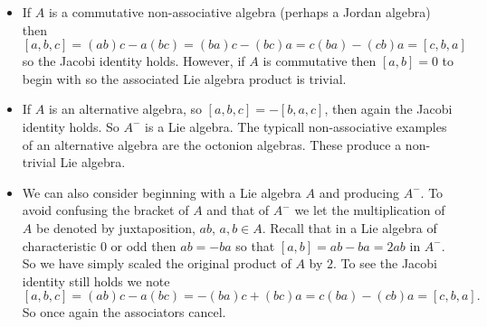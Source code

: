 \documentclass[12pt]{article}
\begin{document}
\begin{itemize}
\item If $A$ is a commutative non-associative algebra (perhaps a Jordan algebra) then 
   \[[a,b,c]=(ab)c-a(bc)=(ba)c-(bc)a=c(ba)-(cb)a=[c,b,a]\]
so the Jacobi identity holds.  However, if $A$ is commutative
then $[a,b]=0$ to begin with so the associated Lie algebra product is
trivial.

\item If $A$ is an alternative algebra, so $[a,b,c]=-[b,a,c]$, then again
the Jacobi identity holds.  So $A^-$ is a Lie algebra.  The typicall non-associative examples of an alternative algebra are the octonion algebras.
These produce a non-trivial Lie algebra.

\item We can also consider beginning with a Lie algebra $A$ and producing
$A^-$.  To avoid confusing the bracket of $A$ and that of $A^-$ we let the
multiplication of $A$ be denoted by juxtaposition, $ab$, $a,b\in A$.  Recall
that in a Lie algebra of characteristic 0 or odd then $ab=-ba$ so that
$[a,b]=ab-ba=2ab$ in $A^-$.  So we have simply scaled the original product
of $A$ by $2$.  To see the Jacobi identity still holds we note
   \[[a,b,c]=(ab)c-a(bc)=-(ba)c+(bc)a=c(ba)-(cb)a=[c,b,a].\]
So once again the associators cancel.
\end{itemize}

\end{document}
